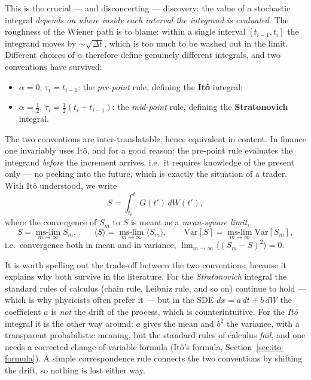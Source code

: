 This is the crucial --- and disconcerting --- discovery: the value of a stochastic integral \emph{depends on where inside each interval the integrand is evaluated}.
The roughness of the Wiener path is to blame: within a single interval $[t_{i-1},t_i]$ the integrand moves by $\sim\sqrt{\Delta t}$, which is too much to be washed out in the limit.
Different choices of $\alpha$ therefore define genuinely different integrals, and two conventions have survived:
\begin{itemize}
    \item $\alpha=0$, $\tau_i=t_{i-1}$: the \emph{pre-point} rule, defining the \textbf{It\^o} integral;
    \item $\alpha=\tfrac{1}{2}$, $\tau_i=\tfrac{1}{2}(t_i+t_{i-1})$: the \emph{mid-point} rule, defining the \textbf{Stratonovich} integral.
\end{itemize}
The two conventions are inter-translatable, hence equivalent in content.
In finance one invariably uses It\^o, and for a good reason: the pre-point rule evaluates the integrand \emph{before} the increment arrives, i.e.\ it requires knowledge of the present only --- no peeking into the future, which is exactly the situation of a trader.
With It\^o understood, we write
\begin{equation}
S = \int_{t_0}^{t} G(t')\,dW(t'),
\end{equation}
where the convergence of $S_m$ to $S$ is meant as a \emph{mean-square limit},
\begin{equation}
S = \operatorname*{ms\text{-}lim}_{m\to\infty} S_m,\qquad
\langle S\rangle = \operatorname*{ms\text{-}lim}_{m\to\infty}\langle S_m\rangle,\qquad
\mathrm{Var}[S] = \operatorname*{ms\text{-}lim}_{m\to\infty}\mathrm{Var}[S_m],
\end{equation}
i.e.\ convergence both in mean and in variance, $\displaystyle\lim_{m\to\infty}\big\langle(S_m-S)^2\big\rangle = 0$.

It is worth spelling out the trade-off between the two conventions, because it explains why both survive in the literature.
For the \emph{Stratonovich} integral the standard rules of calculus (chain rule, Leibniz rule, and so on) continue to hold --- which is why physicists often prefer it --- but in the SDE $dx=a\,dt+b\,dW$ the coefficient $a$ is \emph{not} the drift of the process, which is counterintuitive.
For the \emph{It\^o} integral it is the other way around: $a$ gives the mean and $b^2$ the variance, with a transparent probabilistic meaning, but the standard rules of calculus \emph{fail}, and one needs a corrected change-of-variable formula (It\^o's formula, Section~\ref{sec:ito-formula}).
A simple correspondence rule connects the two conventions by shifting the drift, so nothing is lost either way.


